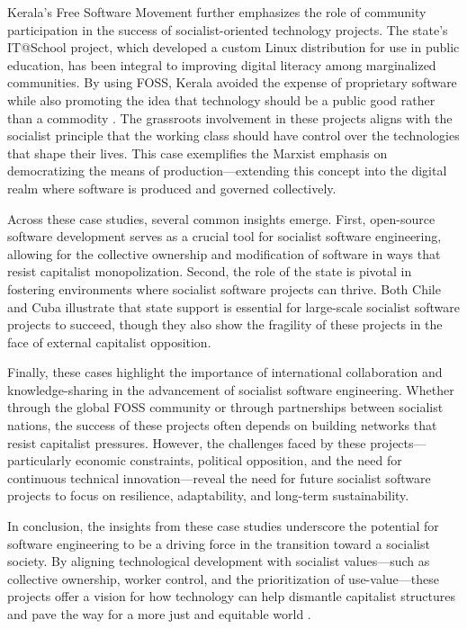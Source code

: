 \begin{refsection}
Kerala’s Free Software Movement further emphasizes the role of community participation in the success of socialist-oriented technology projects. The state’s IT@School project, which developed a custom Linux distribution for use in public education, has been integral to improving digital literacy among marginalized communities. By using FOSS, Kerala avoided the expense of proprietary software while also promoting the idea that technology should be a public good rather than a commodity \cite[pp.~120]{kwet2021}. The grassroots involvement in these projects aligns with the socialist principle that the working class should have control over the technologies that shape their lives. This case exemplifies the Marxist emphasis on democratizing the means of production—extending this concept into the digital realm where software is produced and governed collectively.

Across these case studies, several common insights emerge. First, open-source software development serves as a crucial tool for socialist software engineering, allowing for the collective ownership and modification of software in ways that resist capitalist monopolization. Second, the role of the state is pivotal in fostering environments where socialist software projects can thrive. Both Chile and Cuba illustrate that state support is essential for large-scale socialist software projects to succeed, though they also show the fragility of these projects in the face of external capitalist opposition.

Finally, these cases highlight the importance of international collaboration and knowledge-sharing in the advancement of socialist software engineering. Whether through the global FOSS community or through partnerships between socialist nations, the success of these projects often depends on building networks that resist capitalist pressures. However, the challenges faced by these projects—particularly economic constraints, political opposition, and the need for continuous technical innovation—reveal the need for future socialist software projects to focus on resilience, adaptability, and long-term sustainability.

In conclusion, the insights from these case studies underscore the potential for software engineering to be a driving force in the transition toward a socialist society. By aligning technological development with socialist values—such as collective ownership, worker control, and the prioritization of use-value—these projects offer a vision for how technology can help dismantle capitalist structures and pave the way for a more just and equitable world \cite[pp.~112]{moody2002}.


\end{refsection}
